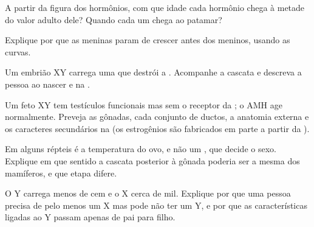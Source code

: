 \begin{exercise}[$\star\star$]\label{exo:g11:becoming-male-female:9}
A partir da figura dos hormônios, com que idade cada hormônio chega à
metade do valor adulto dele? Quando cada um chega ao patamar?
\end{exercise}

\begin{exercise}[$\star\star$]\label{exo:g11:becoming-male-female:10}
Explique por que as meninas param de crescer antes dos meninos, usando
as curvas.
\end{exercise}

\begin{exercise}[$\star\star$]\label{exo:g11:becoming-male-female:11}
Um embrião XY carrega uma  que destrói a  .
Acompanhe a cascata e descreva a pessoa ao nascer e na .
\end{exercise}

\begin{exercise}[$\star\star\star$]\label{exo:g11:becoming-male-female:12}
Um feto XY tem testículos funcionais mas  sem o receptor da
; o AMH age normalmente. Preveja as gônadas, cada conjunto
de ductos, a anatomia externa e os caracteres secundários na 
(os estrogênios são fabricados em parte a partir da ).
\end{exercise}

\begin{exercise}[$\star\star\star$]\label{exo:g11:becoming-male-female:13}
Em alguns répteis é a temperatura do ovo, e não um , que
decide o sexo. Explique em que sentido a cascata posterior à gônada
poderia ser a mesma dos mamíferos, e que etapa difere.
\end{exercise}

\begin{exercise}[$\star\star\star$]\label{exo:g11:becoming-male-female:14}
O  Y carrega menos de cem  e o X cerca de mil. Explique
por que uma pessoa precisa de pelo menos um X mas pode não ter um Y, e
por que as características ligadas ao Y passam apenas de pai para filho.
\end{exercise}

